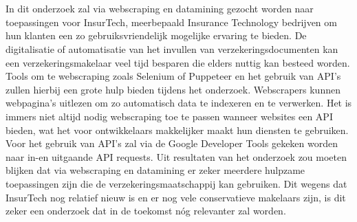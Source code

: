 
%
%

%



\chapter*{}

In dit onderzoek zal via webscraping en datamining gezocht worden naar toepassingen voor InsurTech, meerbepaald Insurance Technology bedrijven om hun klanten een zo gebruiksvriendelijk mogelijke ervaring te bieden. De digitalisatie of automatisatie van het invullen van verzekeringsdocumenten kan een verzekeringsmakelaar veel tijd besparen die elders nuttig kan besteed worden. Tools om te webscraping zoals Selenium of Puppeteer en het gebruik van API’s zullen hierbij een grote hulp bieden tijdens het onderzoek. Webscrapers kunnen webpagina’s uitlezen om zo automatisch data te indexeren en te verwerken. Het is immers niet altijd nodig webscraping toe te passen wanneer websites een API bieden, wat het voor ontwikkelaars makkelijker maakt hun diensten te gebruiken. Voor het gebruik van API’s zal via de Google Developer Tools gekeken worden naar in-en uitgaande API requests. Uit resultaten van het onderzoek zou moeten blijken dat via webscraping en datamining er zeker meerdere hulpzame toepassingen zijn die de verzekeringsmaatschappij kan gebruiken. Dit wegens dat InsurTech nog relatief nieuw is en er nog vele conservatieve makelaars zijn, is dit zeker een onderzoek dat in de toekomst nóg relevanter zal worden.
